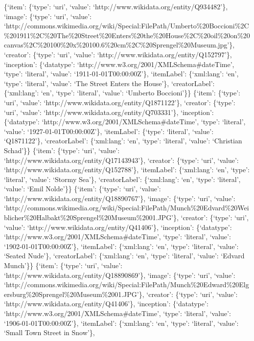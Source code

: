 \documentclass[
  letterpaper,
]{book}
\begin{document}
\{`item': \{`type': `uri', `value':
`http://www.wikidata.org/entity/Q934482'\}, `image': \{`type': `uri',
`value':
`http://commons.wikimedia.org/wiki/Special:FilePath/Umberto\%20Boccioni\%2C\%201911\%2C\%20The\%20Street\%20Enters\%20the\%20House\%2C\%20oil\%20on\%20canvas\%2C\%20100\%20x\%20100.6\%20cm\%2C\%20Sprengel\%20Museum.jpg'\},
`creator': \{`type': `uri', `value':
`http://www.wikidata.org/entity/Q152797'\}, `inception': \{`datatype':
`http://www.w3.org/2001/XMLSchema\#dateTime', `type': `literal',
`value': `1911-01-01T00:00:00Z'\}, `itemLabel': \{`xml:lang': `en',
`type': `literal', `value': `The Street Enters the House'\},
`creatorLabel': \{`xml:lang': `en', `type': `literal', `value': `Umberto
Boccioni'\}\} \{`item': \{`type': `uri', `value':
`http://www.wikidata.org/entity/Q1871122'\}, `creator': \{`type': `uri',
`value': `http://www.wikidata.org/entity/Q703331'\}, `inception':
\{`datatype': `http://www.w3.org/2001/XMLSchema\#dateTime', `type':
`literal', `value': `1927-01-01T00:00:00Z'\}, `itemLabel': \{`type':
`literal', `value': `Q1871122'\}, `creatorLabel': \{`xml:lang': `en',
`type': `literal', `value': `Christian Schad'\}\} \{`item': \{`type':
`uri', `value': `http://www.wikidata.org/entity/Q17143943'\}, `creator':
\{`type': `uri', `value': `http://www.wikidata.org/entity/Q152788'\},
`itemLabel': \{`xml:lang': `en', `type': `literal', `value': `Stormy
Sea'\}, `creatorLabel': \{`xml:lang': `en', `type': `literal', `value':
`Emil Nolde'\}\} \{`item': \{`type': `uri', `value':
`http://www.wikidata.org/entity/Q18890767'\}, `image': \{`type': `uri',
`value':
`http://commons.wikimedia.org/wiki/Special:FilePath/Munch\%20Edvard\%20Weiblicher\%20Halbakt\%20Sprengel\%20Museum\%2001.JPG'\},
`creator': \{`type': `uri', `value':
`http://www.wikidata.org/entity/Q41406'\}, `inception': \{`datatype':
`http://www.w3.org/2001/XMLSchema\#dateTime', `type': `literal',
`value': `1902-01-01T00:00:00Z'\}, `itemLabel': \{`xml:lang': `en',
`type': `literal', `value': `Seated Nude'\}, `creatorLabel':
\{`xml:lang': `en', `type': `literal', `value': `Edvard Munch'\}\}
\{`item': \{`type': `uri', `value':
`http://www.wikidata.org/entity/Q18890869'\}, `image': \{`type': `uri',
`value':
`http://commons.wikimedia.org/wiki/Special:FilePath/Munch\%20Edward\%20Elgersburg\%20Sprengel\%20Museum\%2001.JPG'\},
`creator': \{`type': `uri', `value':
`http://www.wikidata.org/entity/Q41406'\}, `inception': \{`datatype':
`http://www.w3.org/2001/XMLSchema\#dateTime', `type': `literal',
`value': `1906-01-01T00:00:00Z'\}, `itemLabel': \{`xml:lang': `en',
`type': `literal', `value': `Small Town Street in Snow'\},
\end{document}
